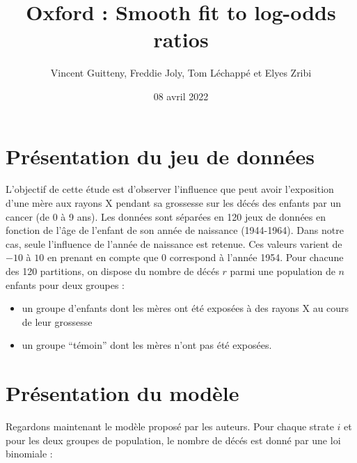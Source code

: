 \documentclass[
]{article}
\title{Oxford : Smooth fit to log-odds ratios}
\author{Vincent Guitteny, Freddie Joly, Tom Léchappé et Elyes Zribi}
\date{08 avril 2022}
\providecommand{\tightlist}{%
  \setlength{\itemsep}{0pt}\setlength{\parskip}{0pt}}
\begin{document}
\maketitle

\newenvironment{cols}[1][]{}{}
\newenvironment{col}[1]{\begin{minipage}{#1}\ignorespaces}{%
\end{minipage}
\ifhmode\unskip\fi
\aftergroup\useignorespacesandallpars}
\def\useignorespacesandallpars#1\ignorespaces\fi{%
#1\fi\ignorespacesandallpars}
\makeatletter
\def\ignorespacesandallpars{%
  \@ifnextchar\par
    {\expandafter\ignorespacesandallpars\@gobble}%
    {}%
}
\makeatother

\renewcommand\contentsname{Table des matières}
\newpage
\tableofcontents
\newpage

\hypertarget{pruxe9sentation-du-jeu-de-donnuxe9es}{%
\section{Présentation du jeu de
données}\label{pruxe9sentation-du-jeu-de-donnuxe9es}}

L'objectif de cette étude est d'observer l'influence que peut avoir
l'exposition d'une mère aux rayons X pendant sa grossesse sur les décés
des enfants par un cancer (de 0 à 9 ans). Les données sont séparées en
120 jeux de données en fonction de l'âge de l'enfant de son année de
naissance (1944-1964). Dans notre cas, seule l'influence de l'année de
naissance est retenue. Ces valeurs varient de \(-10\) à \(10\) en
prenant en compte que \(0\) correspond à l'année 1954. Pour chacune des
120 partitions, on dispose du nombre de décés \(r\) parmi une population
de \(n\) enfants pour deux groupes :

\begin{itemize}
\tightlist
\item
  un groupe d'enfants dont les mères ont été exposées à des rayons X au
  cours de leur grossesse
\item
  un groupe ``témoin'' dont les mères n'ont pas été exposées.
\end{itemize}

\hypertarget{pruxe9sentation-du-moduxe8le}{%
\section{Présentation du modèle}\label{pruxe9sentation-du-moduxe8le}}

Regardons maintenant le modèle proposé par les auteurs. Pour chaque
strate \(i\) et pour les deux groupes de population, le nombre de décés
est donné par une loi binomiale :
\end{document}
